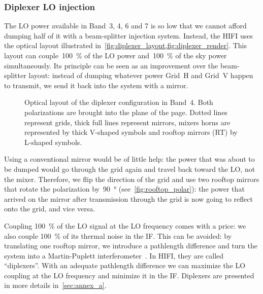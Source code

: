 \subsubsection{Diplexer LO injection}
\label{sec:diplexer_lo_injection}
The LO power available in Band~3, 4, 6 and 7 is so low that we cannot afford dumping half of it with a beam-splitter injection system.
Instead, the HIFI uses the optical layout illustrated in~\cref{fig:diplexer_layout,fig:diplexer_render}.
This layout can couple~\SI{100}{\percent} of the LO power and~\SI{100}{\percent} of the sky power simultaneously.
Its principle can be seen as an improvement over the beam-splitter layout:
instead of dumping whatever power Grid~H and Grid~V happen to transmit, we send it back into the system with a mirror.

\begin{figure}
    \centering
    \footnotesize
    
    \caption{Optical layout of the diplexer configuration in Band~4.
    Both polarizations are brought into the plane of the page.
    Dotted lines represent grids, thick full lines represent mirrors, mixers horns are represented by thick V-shaped symbols and rooftop mirrors (RT) by L-shaped symbols.
    }
    \label{fig:diplexer_layout}
\end{figure}

Using a conventional mirror would be of little help: the power that was about to be dumped would go through the grid again and travel back toward the LO, not the mixer.
Therefore, we flip the direction of the grid and use two rooftop mirrors that rotate the polarization by~\SI{90}{\degree} (see~\vref{fig:rooftop_polar}): the power that arrived on the mirror after transmission through the grid is now going to reflect onto the grid, and vice versa.

Coupling \SI{100}{\percent} of the LO signal at the LO frequency comes with a price: we also couple \SI{100}{\percent} of its thermal noise in the IF.
This can be avoided: by translating one rooftop mirror, we introduce a pathlength difference and turn the system into a Martin-Puplett interferometer~\parencite{martin1982polarizing}.
In HIFI, they are called ``diplexers''.
With an adequate pathlength difference we can maximize the LO coupling at the LO frequency and minimize it in the IF.
Diplexers are presented in more details in~\cref{sec:annex_a}.

